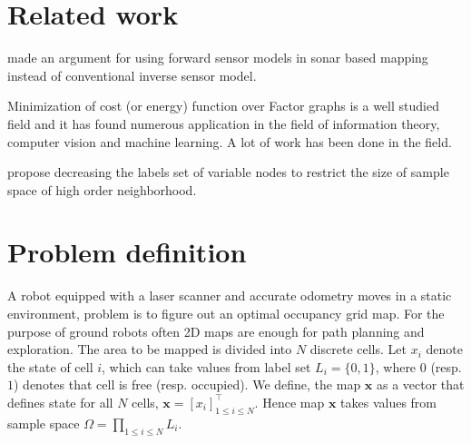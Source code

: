 \documentclass[letterpaper, 10 pt, conference]{ieeeconf} %
\newcommand{\vect}[1]{\mathbf{#1}}
\begin{document}
\section{Related work}

\cite{thrun2003learning} made an argument for using forward sensor models in sonar based mapping instead of conventional inverse sensor model.


Minimization of cost (or energy) function over Factor graphs is a well studied field and it has found numerous application in the field of information theory, computer vision and machine learning. A lot of work has been done in the field.

\cite{leonardis2006efficient}  propose decreasing the labels set of variable
nodes to restrict the size of sample space of high order neighborhood. 

\section{Problem definition}
\newcommand{\map}{\vect{x}}
A robot equipped with a laser scanner and accurate odometry moves in a static
environment, problem is to figure out an optimal occupancy grid map. For the
purpose of ground robots often 2D maps are enough for path planning and
exploration.
The area to be mapped is divided into $N$ discrete cells. Let $x_i$ denote the state of cell $i$, which can take values from label set $L_i = \{0, 1\}$, where $0$ (resp. $1$) denotes that cell is free (resp. occupied). We define, the map $\map$ as a vector that defines state for all $N$ cells, $\map = [x_i]^\top_{1 \le i \le N}$. Hence map $\map$ takes values from sample space $\Omega = \prod_{1 \le i \le N}L_i$.
\end{document}
